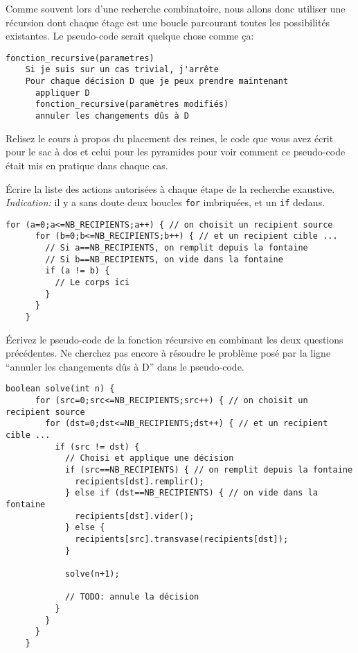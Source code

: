 \documentclass[10pt]{article}\usepackage[correction,nu]{esial}%
\begin{document}
\medskip Comme souvent lors d'une recherche combinatoire, nous allons donc
utiliser une récursion dont chaque étage est une boucle parcourant toutes les
possibilités existantes. Le pseudo-code serait quelque chose comme ça:
\begin{Verbatim}[gobble=2]
  fonction_recursive(parametres)
    Si je suis sur un cas trivial, j'arrête
    Pour chaque décision D que je peux prendre maintenant
      appliquer D
      fonction_recursive(paramètres modifiés)
      annuler les changements dûs à D
\end{Verbatim}

\Question Relisez le cours à propos du placement des reines, le code que vous
avez écrit pour le sac à dos et celui pour les pyramides pour voir comment ce
pseudo-code était mis en pratique dans chaque cas.

\Question Écrire la liste des actions autorisées à chaque étape de la recherche
exaustive.\\ \textit{Indication:} il y a sans doute deux boucles \texttt{for}
imbriquées, et un \texttt{if} dedans.

\begin{Reponse}
  \begin{Verbatim}[gobble=4]
    for (a=0;a<=NB_RECIPIENTS;a++) { // on choisit un recipient source 
      for (b=0;b<=NB_RECIPIENTS;b++) { // et un recipient cible ... 
        // Si a==NB_RECIPIENTS, on remplit depuis la fontaine
        // Si b==NB_RECIPIENTS, on vide dans la fontaine
        if (a != b) {
          // Le corps ici
        }
      }
    }
  \end{Verbatim}
\end{Reponse}

\Question Écrivez le pseudo-code de la fonction récursive en combinant les deux
questions précédentes. Ne cherchez pas encore à résoudre le problème posé par
la ligne ``annuler les changements dûs à D'' dans le pseudo-code.

\begin{Reponse}
  \begin{Verbatim}[gobble=4]
    boolean solve(int n) {
      for (src=0;src<=NB_RECIPIENTS;src++) { // on choisit un recipient source 
        for (dst=0;dst<=NB_RECIPIENTS;dst++) { // et un recipient cible ... 
          if (src != dst) {
            // Choisi et applique une décision
            if (src==NB_RECIPIENTS) { // on remplit depuis la fontaine
              recipients[dst].remplir();
            } else if (dst==NB_RECIPIENTS) { // on vide dans la fontaine
              recipients[dst].vider();
            } else {
              recipients[src].transvase(recipients[dst]);
            }
            
            solve(n+1);

            // TODO: annule la décision
          }
        }
      }      
    }
  \end{Verbatim}
\end{Reponse}
\end{document}
